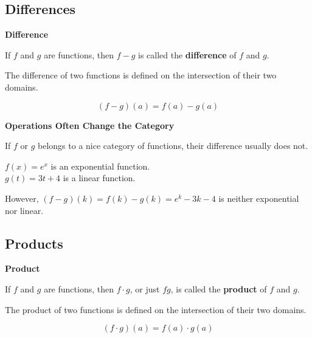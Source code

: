 \documentclass{ximera}
\begin{document}
\subsection*{Differences}



\begin{template}  \textbf{\textcolor{blue!55!black}{Difference}} 


If  $f$ and $g$ are functions, then $f - g$ is called the \textbf{\textcolor{blue!55!black}{difference}} of $f$ and $g$. 

The difference of two functions is defined on the intersection of their two domains. 


\[ (f - g)(a) = f(a) - g(a)  \]



\end{template}



\begin{warning} \textbf{\textcolor{red!70!black}{Operations Often Change the Category}}

If $f$ or $g$ belongs to a nice category of functions, their difference usually does not.

\end{warning}





\begin{example}

$f(x) = e^x$ is an exponential function. \\
$g(t) = 3 t + 4$ is a linear function. 

However, $(f - g)(k) = f(k) - g(k) = e^k - 3 k - 4$ is neither exponential nor linear.

\end{example}
















\subsection*{Products}



\begin{template}  \textbf{\textcolor{blue!55!black}{Product}} 


If  $f$ and $g$ are functions, then $f \cdot g$, or just $f g$, is called the \textbf{\textcolor{blue!55!black}{product}} of $f$ and $g$. 

The product of two functions is defined on the intersection of their two domains. 


\[ (f \cdot g)(a) = f(a) \cdot g(a)  \]



\end{template}
\end{document}

